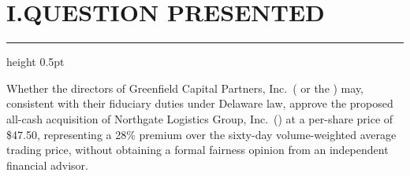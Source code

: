 \section*{I.\quad QUESTION PRESENTED}

{\color{rule}\hrule height 0.5pt}\vspace{6pt}

Whether the directors of Greenfield Capital Partners, Inc.\ ( or the ) may, consistent with their fiduciary duties under Delaware law, approve the proposed all-cash acquisition of Northgate Logistics Group, Inc.\ () at a per-share price of \$47.50, representing a 28\% premium over the sixty-day volume-weighted average trading price, without obtaining a formal fairness opinion from an independent financial advisor.

\vspace{10pt}

